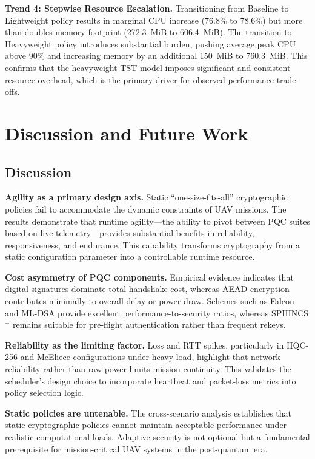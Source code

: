 \documentclass[sigconf,natbib=false]{acmart}
\begin{document}
\textbf{Trend 4: Stepwise Resource Escalation.} Transitioning from Baseline to Lightweight policy results in marginal CPU increase (76.8\% to 78.6\%) but more than doubles memory footprint (272.3~MiB to 606.4~MiB). The transition to Heavyweight policy introduces substantial burden, pushing average peak CPU above 90\% and increasing memory by an additional 150~MiB to 760.3~MiB. This confirms that the heavyweight TST model imposes significant and consistent resource overhead, which is the primary driver for observed performance trade-offs.

\section{Discussion and Future Work}

\subsection{Discussion}

\textbf{Agility as a primary design axis.} Static ``one-size-fits-all'' cryptographic policies fail to accommodate the dynamic constraints of UAV missions. The results demonstrate that runtime agility---the ability to pivot between PQC suites based on live telemetry---provides substantial benefits in reliability, responsiveness, and endurance. This capability transforms cryptography from a static configuration parameter into a controllable runtime resource.

\textbf{Cost asymmetry of PQC components.} Empirical evidence indicates that digital signatures dominate total handshake cost, whereas AEAD encryption contributes minimally to overall delay or power draw. Schemes such as Falcon and ML-DSA provide excellent performance-to-security ratios, whereas SPHINCS$^+$ remains suitable for pre-flight authentication rather than frequent rekeys.

\textbf{Reliability as the limiting factor.} Loss and RTT spikes, particularly in HQC-256 and McEliece configurations under heavy load, highlight that network reliability rather than raw power limits mission continuity. This validates the scheduler's design choice to incorporate heartbeat and packet-loss metrics into policy selection logic.

\textbf{Static policies are untenable.} The cross-scenario analysis establishes that static cryptographic policies cannot maintain acceptable performance under realistic computational loads. Adaptive security is not optional but a fundamental prerequisite for mission-critical UAV systems in the post-quantum era.
\end{document}
